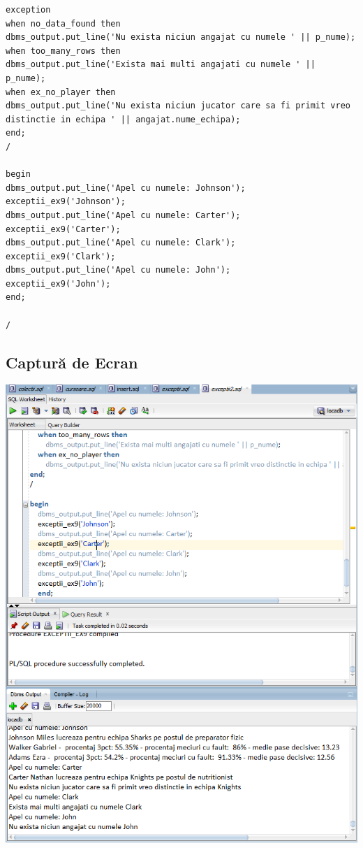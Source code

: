 \documentclass{article}
\begin{document}
\begin{lstlisting}
exception
when no_data_found then
dbms_output.put_line('Nu exista niciun angajat cu numele ' || p_nume);
when too_many_rows then
dbms_output.put_line('Exista mai multi angajati cu numele ' || p_nume);
when ex_no_player then
dbms_output.put_line('Nu exista niciun jucator care sa fi primit vreo distinctie in echipa ' || angajat.nume_echipa);
end;
/

begin
dbms_output.put_line('Apel cu numele: Johnson');
exceptii_ex9('Johnson');
dbms_output.put_line('Apel cu numele: Carter');
exceptii_ex9('Carter');
dbms_output.put_line('Apel cu numele: Clark');
exceptii_ex9('Clark');
dbms_output.put_line('Apel cu numele: John');
exceptii_ex9('John');
end;

/
\end{lstlisting}

\subsection{Captură de Ecran}
\includegraphics[width=40em, keepaspectratio]{rez_exceptii9}
\pagebreak
\end{document}
